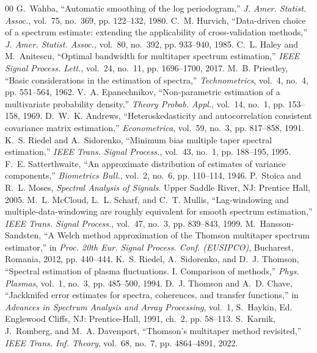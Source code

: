\documentclass[10pt,twocolumn]{article}
\begin{document}
\begin{thebibliography}{00}
 G.~Wahba, ``Automatic smoothing of the log periodogram,'' \emph{J. Amer. Statist. Assoc.}, vol.~75, no.~369, pp. 122--132, 1980.
 C.~M. Hurvich, ``Data-driven choice of a spectrum estimate: extending the applicability of cross-validation methods,'' \emph{J. Amer. Statist. Assoc.}, vol.~80, no.~392, pp. 933--940, 1985.
 C.~L. Haley and M.~Anitescu, ``Optimal bandwidth for multitaper spectrum estimation,'' \emph{IEEE Signal Process. Lett.}, vol.~24, no.~11, pp. 1696--1700, 2017.
 M.~B. Priestley, ``Basic considerations in the estimation of spectra,'' \emph{Technometrics}, vol.~4, no.~4, pp. 551--564, 1962.
 V.~A. Epanechnikov, ``Non-parametric estimation of a multivariate probability density,'' \emph{Theory Probab. Appl.}, vol.~14, no.~1, pp. 153--158, 1969.
 D.~W.~K. Andrews, ``Heteroskedasticity and autocorrelation consistent covariance matrix estimation,'' \emph{Econometrica}, vol.~59, no.~3, pp. 817--858, 1991.
 K.~S. Riedel and A.~Sidorenko, ``Minimum bias multiple taper spectral estimation,'' \emph{IEEE Trans. Signal Process.}, vol.~43, no.~1, pp. 188--195, 1995.
 F.~E. Satterthwaite, ``An approximate distribution of estimates of variance components,'' \emph{Biometrics Bull.}, vol.~2, no.~6, pp. 110--114, 1946.
 P.~Stoica and R.~L. Moses, \emph{Spectral Analysis of Signals}. Upper Saddle River, NJ: Prentice Hall, 2005.
 M.~L. McCloud, L.~L. Scharf, and C.~T. Mullis, ``Lag-windowing and multiple-data-windowing are roughly equivalent for smooth spectrum estimation,'' \emph{IEEE Trans. Signal Process.}, vol.~47, no.~3, pp. 839--843, 1999.
 M.~Hansson-Sandsten, ``A Welch method approximation of the Thomson multitaper spectrum estimator,'' in \emph{Proc. 20th Eur. Signal Process. Conf. (EUSIPCO)}, Bucharest, Romania, 2012, pp. 440--444.
 K.~S. Riedel, A.~Sidorenko, and D.~J. Thomson, ``Spectral estimation of plasma fluctuations. I. Comparison of methods,'' \emph{Phys. Plasmas}, vol.~1, no.~3, pp. 485--500, 1994.
 D.~J. Thomson and A.~D. Chave, ``Jackknifed error estimates for spectra, coherences, and transfer functions,'' in \emph{Advances in Spectrum Analysis and Array Processing}, vol.~1, S.~Haykin, Ed. Englewood Cliffs, NJ: Prentice-Hall, 1991, ch.~2, pp. 58--113.
 S.~Karnik, J.~Romberg, and M.~A. Davenport, ``Thomson's multitaper method revisited,'' \emph{IEEE Trans. Inf. Theory}, vol.~68, no.~7, pp. 4864--4891, 2022.

\end{thebibliography}
\end{document}
